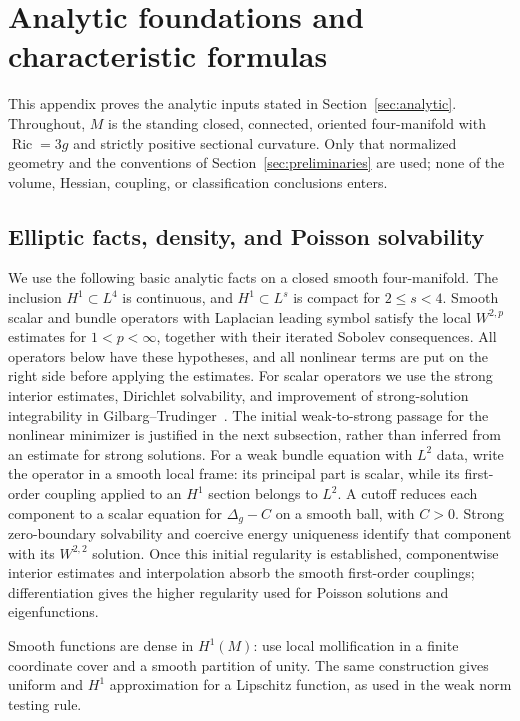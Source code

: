 \section{Analytic foundations and characteristic formulas}
\label{app:analytic}

This appendix proves the analytic inputs stated in
Section~\ref{sec:analytic}. Throughout, $M$ is the standing closed,
connected, oriented four-manifold with $\operatorname{Ric}=3g$ and
strictly positive sectional curvature. Only that normalized geometry
and the conventions of Section~\ref{sec:preliminaries} are used; none
of the volume, Hessian, coupling, or classification conclusions enters.

\subsection{Elliptic facts, density, and Poisson solvability}
\label{app:analytic-preliminaries}

We use the following basic analytic facts on a closed smooth
four-manifold. The inclusion $H^1\subset L^4$ is continuous, and
$H^1\subset L^s$ is compact for $2\le s<4$. Smooth scalar and bundle
operators with Laplacian leading symbol satisfy the local
$W^{2,p}$ estimates for $1<p<\infty$, together with their iterated
Sobolev consequences. All operators below have these hypotheses,
and all nonlinear terms are put on the right side before applying
the estimates. For scalar operators we use the strong interior estimates,
Dirichlet solvability, and improvement of strong-solution integrability
in Gilbarg--Trudinger~\cite[Theorem~9.11, pp.~235--236;
Theorem~9.15 and Lemma~9.16, pp.~241--242]{GilbargTrudinger}.
The initial weak-to-strong passage for the nonlinear minimizer is
justified in the next subsection, rather than inferred from an estimate
for strong solutions.
For a weak bundle equation with $L^2$ data, write the operator in a smooth
local frame: its principal part is scalar, while its first-order coupling
applied to an $H^1$ section belongs to $L^2$. A cutoff reduces each
component to a scalar equation for $\Delta_g-C$ on a smooth ball,
with $C>0$. Strong zero-boundary solvability and coercive energy
uniqueness identify that component with its $W^{2,2}$ solution.
Once this initial regularity is established, componentwise interior
estimates and interpolation absorb the smooth first-order couplings;
differentiation gives the higher regularity used for Poisson solutions
and eigenfunctions.

Smooth functions are dense in $H^1(M)$: use local mollification in a
finite coordinate cover and a smooth partition of unity. The same
construction gives uniform and $H^1$ approximation for a Lipschitz
function, as used in the weak norm testing rule.

